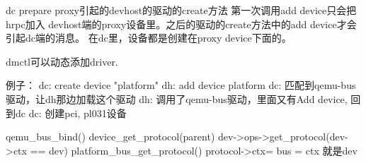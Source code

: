 dc prepare proxy引起的devhost的驱动的create方法
第一次调用add device只会把hrpc加入
devhost端的proxy设备里。之后的驱动的create方法中的add device才会
引起dc端的消息。
在dc里，设备都是创建在proxy device下面的。

dmctl可以动态添加driver.

例子：
dc: create device "platform"
dh: add device platform
dc: 匹配到qemu-bus 驱动，让dh那边加载这个驱动
dh: 调用了qemu-bus驱动，里面又有Add device, 回到dc
dc: 创建pci, pl031设备



qemu_bus_bind()
    device_get_protocol(parent)
        dev->ops->get_protocol(dev->ctx == dev)
          platform_bus_get_protocol()
              protocol->ctx= bus = ctx 就是dev

              